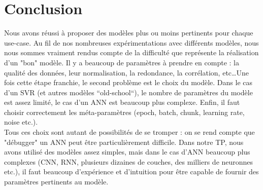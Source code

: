 \documentclass{article}
\begin{document}
\section{Conclusion}
Nous avons réussi à proposer des modèles plus ou moins pertinents pour chaque use-case. Au fil de nos nombreuses expérimentations avec différents modèles, nous nous sommes vraiment rendus compte de la difficulté que représente la réalisation d'un "bon" modèle. Il y a beaucoup de paramètres à prendre en compte : la qualité des données, leur normalisation, la redondance, la corrélation, etc\ldots Une fois cette étape franchie, le second problème est le choix du modèle. Dans le cas d'un SVR (et autres modèles ``old-school``), le nombre de paramètres du modèle est assez limité, le cas d'un ANN est beaucoup plus complexe. Enfin, il faut choisir correctement les méta-paramètres (epoch, batch, chunk, learning rate, noise etc.). \\Tous ces choix sont autant de possibilités de se tromper : on se rend compte que "débugger" un ANN peut être particulièrement difficile. Dans notre TP, nous avons utilisé des modèles assez simples, mais dans le cas d'ANN beaucoup plus complexes (CNN, RNN, plusieurs dizaines de couches, des milliers de neuronnes etc.), il faut beaucoup d'expérience et d'intuition pour être capable de fournir des paramètres pertinents au modèle.
\end{document}

